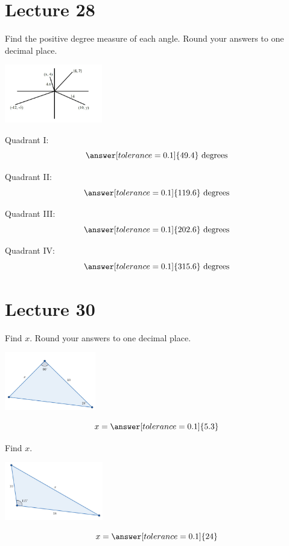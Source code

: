 \documentclass{ximera}
\begin{document}
 \section{Lecture 28}
\begin{problem}\label{prob:160hom11prob1}
Find the positive degree measure of each angle. Round your answers to one decimal place.
\begin{image}
   
\includegraphics[height=1in]{160H11pic1.jpg}~
 
\end{image}

Quadrant I:
$$\answer[tolerance=0.1]{49.4}\mbox{ degrees}$$

Quadrant II:
$$\answer[tolerance=0.1]{119.6}\mbox{ degrees}$$

Quadrant III:
$$\answer[tolerance=0.1]{202.6}\mbox{ degrees}$$

Quadrant IV:
$$\answer[tolerance=0.1]{315.6}\mbox{ degrees}$$
\end{problem}
 
 
 
 
 
  \section{Lecture 30}
  \begin{problem}\label{prob:160hom12prob1}
  Find $x$.  Round your answers to one decimal place.
\begin{image}
   
\includegraphics[height=1in]{160H12pic1.jpg}~
 
\end{image}
$$x=\answer[tolerance=0.1]{5.3}$$
\end{problem}

\begin{problem}\label{prob:160hom12prob2}
Find $x$.
\begin{image}
   
\includegraphics[height=1in]{160H12pic3.jpg}~
 
\end{image}
$$x=\answer[tolerance=0.1]{24}$$
\end{problem}
\end{document}
